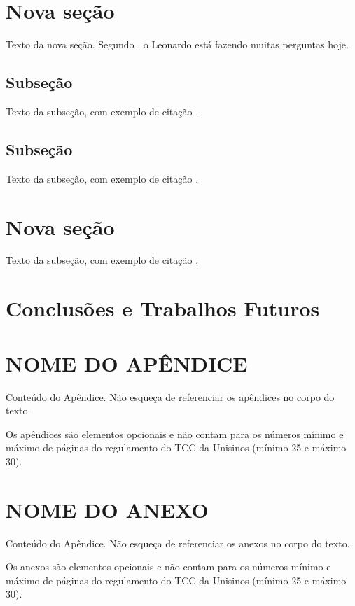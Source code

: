 \documentclass[english,brazilian]{UNISINOSartigo} %
\begin{document}
\section{Nova seção}
Texto da nova seção. Segundo , o Leonardo está fazendo muitas perguntas hoje.

\subsection{Subseção}
Texto da subseção, com exemplo de citação \cite{book}.

\subsection{Subseção}
Texto da subseção, com exemplo de citação \cite{article}.

\section{Nova seção}
Texto da subseção, com exemplo de citação \cite{inproceedings}.

\section{Conclusões e Trabalhos Futuros}



\appendix
\section{NOME DO APÊNDICE}

Conteúdo do Apêndice. Não esqueça de referenciar os apêndices no corpo do texto.

Os apêndices são elementos opcionais e não contam para os números mínimo e máximo de páginas do regulamento do TCC da Unisinos (mínimo 25 e máximo 30).

\annex
\section{NOME DO ANEXO}
Conteúdo do Apêndice. Não esqueça de referenciar os anexos no corpo do texto.

Os anexos são elementos opcionais e não contam para os números mínimo e máximo de páginas do regulamento do TCC da Unisinos (mínimo 25 e máximo 30).
\end{document}
